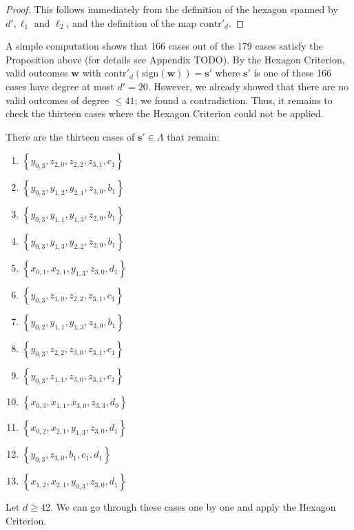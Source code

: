 \begin{proof}
    This follows immediately from the definition of the hexagon spanned by \( d', \ell_1 \) and \( \ell_2 \), and the definition of the map \( \mathrm{contr}'_d \).
\end{proof}

A simple computation shows that 166 cases out of the 179 cases satisfy the Proposition above (for details see Appendix TODO). By the Hexagon Criterion, valid outcomes \( \mathbf{w} \) with \( \mathrm{contr}'_d(\mathrm{sign}(\mathbf{w})) = \mathbf{s}' \) where \( \mathbf{s}' \) is one of these 166 cases have degree at most \( d' = 20 \). However, we already showed that there are no valid outcomes of degree \( \leq 41 \); we found a contradiction. Thus, it remains to check the thirteen cases where the Hexagon Criterion could not be applied.

There are the thirteen cases of \( \mathbf{s}' \in \Lambda \) that remain:
\begin{enumerate}
    \item \( \left\{ y_{0,3}, z_{2,0}, z_{2,2}, z_{3,1}, c_1 \right\} \)
    \item \( \left\{ y_{0,3}, y_{1,2}, y_{2,1}, z_{3,0}, b_1 \right\} \)
    \item \( \left\{ y_{0,3}, y_{1,1}, y_{1,3}, z_{2,0}, b_1 \right\} \)
    \item \( \left\{ y_{0,3}, y_{1,3}, y_{2,2}, z_{2,0}, b_1 \right\} \)
    \item \( \left\{ x_{0,1}, x_{2,1}, y_{1,3}, z_{3,0}, d_1 \right\} \)
    \item \( \left\{ y_{0,3}, z_{1,0}, z_{2,2}, z_{3,1}, c_1 \right\} \)
    \item \( \left\{ y_{0,2}, y_{1,1}, y_{1,3}, z_{3,0}, b_1 \right\} \)
    \item \( \left\{ y_{0,3}, z_{2,2}, z_{3,0}, z_{3,1}, c_1 \right\} \)
    \item \( \left\{ y_{0,3}, z_{1,1}, z_{3,0}, z_{3,1}, c_1 \right\} \)
    \item \( \left\{ x_{0,3}, x_{1,1}, x_{3,0}, z_{3,3}, d_0 \right\} \)
    \item \( \left\{ x_{0,2}, x_{2,1}, y_{1,3}, z_{3,0}, d_1 \right\} \)
    \item \( \left\{ y_{0,3}, z_{3,0}, b_1, c_1, d_1 \right\} \)
    \item \( \left\{ x_{1,2}, x_{2,1}, y_{0,3}, z_{3,0}, d_1 \right\} \)
\end{enumerate}
Let \( d \geq 42 \). We can go through these cases one by one and apply the Hexagon Criterion.


